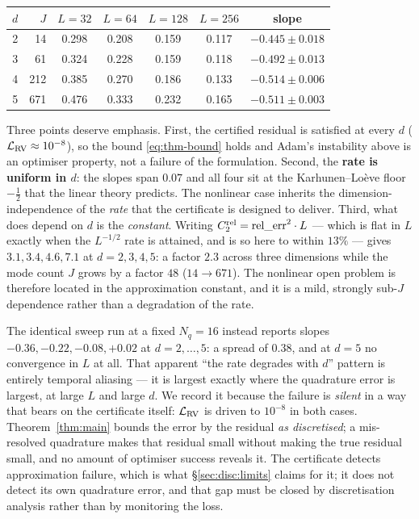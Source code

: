 \begin{center}
\begin{tabular}{rrccccc}
\toprule
$d$ & $J$ & $L = 32$ & $L = 64$ & $L = 128$ & $L = 256$ & slope \\
\midrule
2 & 14  & 0.298 & 0.208 & 0.159 & 0.117 & $-0.445 \pm 0.018$ \\
3 & 61  & 0.324 & 0.228 & 0.159 & 0.118 & $-0.492 \pm 0.013$ \\
4 & 212 & 0.385 & 0.270 & 0.186 & 0.133 & $-0.514 \pm 0.006$ \\
5 & 671 & 0.476 & 0.333 & 0.232 & 0.165 & $-0.511 \pm 0.003$ \\
\bottomrule
\end{tabular}
\end{center}

\noindent Three points deserve emphasis. First, the certified residual is
satisfied at every $d$ ($\mathcal{L}_{\rm RV} \approx 10^{-8}$), so the
bound \eqref{eq:thm-bound} holds and Adam's instability above is an
optimiser property, not a failure of the formulation. Second, the
\textbf{rate is uniform in $d$}: the slopes span $0.07$ and all four sit
at the Karhunen--Lo\`eve floor $-\tfrac12$ that the linear theory
predicts. The nonlinear case inherits the dimension-independence of the
\emph{rate} that the certificate is designed to deliver. Third, what does
depend on $d$ is the \emph{constant}. Writing $C_2^{\rm rel} =
\mathrm{rel\_err}^2 \cdot L$ --- which is flat in $L$ exactly when the
$L^{-1/2}$ rate is attained, and is so here to within $13\%$ --- gives
$3.1, 3.4, 4.6, 7.1$ at $d = 2, 3, 4, 5$: a factor $2.3$ across three
dimensions while the mode count $J$ grows by a factor $48$ ($14 \to
671$). The nonlinear open problem is therefore located in the
approximation constant, and it is a mild, strongly sub-$J$ dependence
rather than a degradation of the rate.

\begin{remark}
\label{rem:aliasing}
The identical sweep run at a fixed $N_q = 16$ instead reports slopes
$-0.36, -0.22, -0.08, +0.02$ at $d = 2, \dots, 5$: a spread of $0.38$,
and at $d = 5$ no convergence in $L$ at all. That apparent ``the rate
degrades with $d$'' pattern is entirely temporal aliasing --- it is
largest exactly where the quadrature error is largest, at large $L$ and
large $d$. We record it because the failure is \emph{silent} in a way
that bears on the certificate itself: $\mathcal{L}_{\rm RV}$ is driven to
$10^{-8}$ in both cases. Theorem~\ref{thm:main} bounds the error by the
residual \emph{as discretised}; a mis-resolved quadrature makes that
residual small without making the true residual small, and no amount of
optimiser success reveals it. The certificate detects approximation
failure, which is what \S\ref{sec:disc:limits} claims for it; it does not
detect its own quadrature error, and that gap must be closed by
discretisation analysis rather than by monitoring the loss.
\end{remark}

